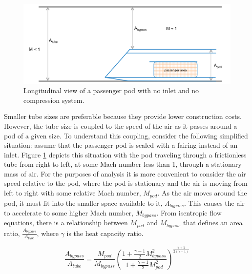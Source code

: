 \documentclass[heading.tex]{subfiles}
\begin{document}
\begin{figure}[hbtp]
\centering
\includegraphics[width=.85\textwidth]{images/closedCapsule.png}
\caption{Longitudinal view of a passenger pod with no inlet and no compression system.}
\label{f:ClosedPod}
\end{figure}

Smaller tube sizes are preferable because they provide lower construction costs. However, 
the tube size is coupled to the speed of the air as it passes around a pod of a given size. 
To understand this coupling, consider the following simplified situation: assume that the passenger pod is sealed with a fairing
instead of an inlet. Figure \ref{f:ClosedPod} depicts this situation with the pod
traveling through a frictionless tube from right to left, at some Mach number less than 1, through a stationary mass of air. 
For the purposes of analysis it is more convenient to consider the air speed relative to the pod, 
where the pod is stationary and the air is moving from left to right with some relative Mach number, $M_{pod}$. 
As the air moves around the pod, it must fit into the smaller space available to it, $A_{bypass}$.
This causes the air to accelerate to some higher Mach number, $M_{bypass}$.
From isentropic flow equations, there is a relationship between 
$M_{pod}$ and $M_{bypass}$ that defines an area ratio, $\frac{A_{bypass}}{A_{tube}}$, where $\gamma$ is the heat capacity ratio.

\begin{equation}
\frac{A_{bypass}}{A_{tube}} = \frac{M_{pod}}{M_{bypass}}
\left(\frac{1+ \frac{\gamma-1}{2} M_{bypass}^2}
{1+ \frac{\gamma-1}{2} M_{pod}^2}\right)^{\frac{\gamma+1}{2\left(\gamma-1\right)}}
\label{e:a-over-astar}
\end{equation}
\end{document}
